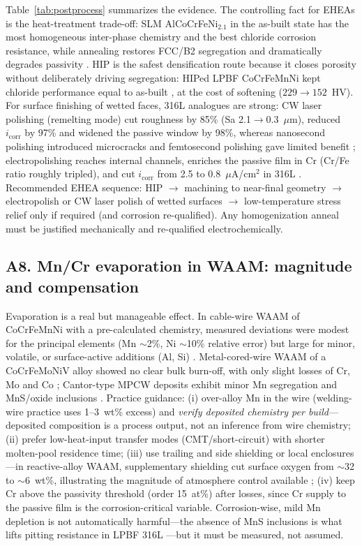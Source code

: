 Table~\ref{tab:postprocess} summarizes the evidence. The controlling fact for EHEAs is the heat-treatment trade-off: SLM AlCoCrFeNi$_{2.1}$ in the as-built state has the most homogeneous inter-phase chemistry and the best chloride corrosion resistance, while annealing restores FCC/B2 segregation and dramatically degrades passivity \cite{slm_ehea_2025}. HIP is the safest densification route because it closes porosity without deliberately driving segregation: HIPed LPBF CoCrFeMnNi kept chloride performance equal to as-built \cite{lpbf_cantor_2024}, at the cost of softening ($229\to152$~HV). For surface finishing of wetted faces, 316L analogues are strong: CW laser polishing (remelting mode) cut roughness by 85\% (Sa 2.1$\to$0.3~$\mu$m), reduced $i_{\mathrm{corr}}$ by 97\% and widened the passive window by 98\%, whereas nanosecond polishing introduced microcracks and femtosecond polishing gave limited benefit \cite{laserpolish2026,laserpolish2023}; electropolishing reaches internal channels, enriches the passive film in Cr (Cr/Fe ratio roughly tripled), and cut $i_{\mathrm{corr}}$ from 2.5 to 0.8~$\mu$A/cm$^{2}$ in 316L \cite{ep2014}. Recommended EHEA sequence: HIP $\rightarrow$ machining to near-final geometry $\rightarrow$ electropolish or CW laser polish of wetted surfaces $\rightarrow$ low-temperature stress relief only if required (and corrosion re-qualified). Any homogenization anneal must be justified mechanically and re-qualified electrochemically.

\subsection{A8. Mn/Cr evaporation in WAAM: magnitude and compensation}
\label{sec:a8}

Evaporation is a real but manageable effect. In cable-wire WAAM of CoCrFeMnNi with a pre-calculated chemistry, measured deviations were modest for the principal elements (Mn $\sim$2\%, Ni $\sim$10\% relative error) but large for minor, volatile, or surface-active additions (Al, Si) \cite{osintsev_waam}. Metal-cored-wire WAAM of a CoCrFeMoNiV alloy showed no clear bulk burn-off, with only slight losses of Cr, Mo and Co \cite{treutler_waam}; Cantor-type MPCW deposits exhibit minor Mn segregation and MnS/oxide inclusions \cite{andersson2026waam}. Practice guidance: (i) over-alloy Mn in the wire (welding-wire practice uses 1--3~wt\% excess) and \emph{verify deposited chemistry per build}---deposited composition is a process output, not an inference from wire chemistry; (ii) prefer low-heat-input transfer modes (CMT/short-circuit) with shorter molten-pool residence time; (iii) use trailing and side shielding or local enclosures---in reactive-alloy WAAM, supplementary shielding cut surface oxygen from $\sim$32 to $\sim$6~wt\%, illustrating the magnitude of atmosphere control available \cite{waam_mg2026}; (iv) keep Cr above the passivity threshold (order 15~at\%) after losses, since Cr supply to the passive film is the corrosion-critical variable. Corrosion-wise, mild Mn depletion is not automatically harmful---the absence of MnS inclusions is what lifts pitting resistance in LPBF 316L \cite{jom_pitting_review2022}---but it must be measured, not assumed.

